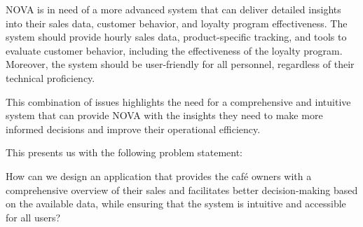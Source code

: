 NOVA is in need of a more advanced system that can deliver detailed insights into their sales data, customer behavior,
and loyalty program effectiveness.
The system should provide hourly sales data, product-specific tracking, and tools to evaluate customer behavior,
including the effectiveness of the loyalty program.
Moreover, the system should be user-friendly for all personnel, regardless of their technical proficiency.

This combination of issues highlights the need for a comprehensive and intuitive system that can provide NOVA with the
insights they need to make more informed decisions and improve their operational efficiency.

This presents us with the following problem statement:

\begin{tcolorbox}[title=Problem statement]
    How can we design an application that provides the café owners with a comprehensive overview of their sales and
    facilitates better decision-making based on the available data, while ensuring that the system is intuitive and
    accessible for all users?
\end{tcolorbox}
